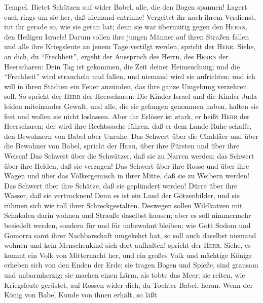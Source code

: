 Tempel.  Bietet Schützen auf wider Babel, alle, die den
Bogen spannen! Lagert euch rings um sie her, daß niemand entrinne!
Vergeltet ihr nach ihrem Verdienst, tut ihr gerade so, wie sie getan
hat; denn sie war übermütig gegen den \textsc{Herrn}, den Heiligen
Israels!  Darum sollen ihre jungen Männer auf ihren
Straßen fallen und alle ihre Kriegsleute an jenem Tage vertilgt werden,
spricht der \textsc{Herr}.  Siehe, an dich, du
``Frechheit'', ergeht der Ausspruch des Herrn, des \textsc{Herrn} der
Heerscharen: Dein Tag ist gekommen, die Zeit deiner Heimsuchung;
 und die ``Frechheit'' wird straucheln und fallen, und
niemand wird sie aufrichten; und ich will in ihren Städten ein Feuer
anzünden, das ihre ganze Umgebung verzehren soll.  So
spricht der \textsc{Herr} der Heerscharen: Die Kinder Israel und die
Kinder Juda leiden miteinander Gewalt, und alle, die sie gefangen
genommen haben, halten sie fest und wollen sie nicht loslassen.
 Aber ihr Erlöser ist stark, er heißt \textsc{Herr} der
Heerscharen; der wird ihre Rechtssache führen, daß er dem Lande Ruhe
schaffe, den Bewohnern von Babel aber Unruhe.  Das
Schwert über die Chaldäer und über die Bewohner von Babel, spricht der
\textsc{Herr}, über ihre Fürsten und über ihre Weisen! 
Das Schwert über die Schwätzer, daß sie zu Narren werden; das Schwert
über ihre Helden, daß sie verzagen!  Das Schwert über
ihre Rosse und über ihre Wagen und über das Völkergemisch in ihrer
Mitte, daß sie zu Weibern werden! Das Schwert über ihre Schätze, daß sie
geplündert werden!  Dürre über ihre Wasser, daß sie
vertrocknen! Denn es ist ein Land der Götzenbilder, und sie rühmen sich
wie toll ihrer Schreckgestalten.  Deswegen sollen
Wildkatzen mit Schakalen darin wohnen und Strauße daselbst hausen; aber
es soll nimmermehr besiedelt werden, sondern für und für unbewohnt
bleiben;  wie Gott Sodom und Gomorra samt ihrer
Nachbarschaft umgekehrt hat, so soll auch daselbst niemand wohnen und
kein Menschenkind sich dort aufhalten! spricht der \textsc{Herr}.
 Siehe, es kommt ein Volk von Mitternacht her, und ein
großes Volk und mächtige Könige erheben sich von den Enden der Erde;
 sie tragen Bogen und Spieße, sind grausam und
unbarmherzig; sie machen einen Lärm, als tobte das Meer; sie reiten, wie
Kriegsleute gerüstet, auf Rossen wider dich, du Tochter Babel, heran.
 Wenn der König von Babel Kunde von ihnen erhält, so läßt
